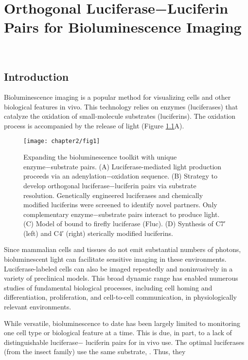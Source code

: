 \chapter{Orthogonal Luciferase−Luciferin Pairs for Bioluminescence Imaging}

\



\section{Introduction}
Bioluminescence imaging is a popular method for visualizing
cells and other biological features in vivo.\cite{RN26} This technology
relies on enzymes (luciferases) that catalyze the oxidation of
small-molecule substrates (luciferins). The oxidation process is
accompanied by the release of light (Figure \ref{fig:overview}A).
\begin{figure}[htbp]
\texttt{[image: chapter2/fig1]}
\centering
\caption[Expanding the bioluminescence toolkit with unique
enzyme−substrate pairs]{Expanding the bioluminescence toolkit with unique
enzyme−substrate pairs. (A) Luciferase-mediated light production
proceeds via an adenylation−oxidation sequence. (B) Strategy to
develop orthogonal luciferase−luciferin pairs via substrate resolution.
Genetically engineered luciferases and chemically modified luciferins
were screened to identify novel partners. Only complementary
enzyme−substrate pairs interact to produce light. (C) Model of \dluciferin{}
bound to firefly luciferase (Fluc). (D) Synthesis of C7′ (left)
and C4′ (right) sterically modified luciferins.}
  \label{fig:overview}
\end{figure}
Since
mammalian cells and tissues do not emit substantial numbers
of photons, bioluminescent light can facilitate sensitive imaging
in these environments.\cite{Prescher:2010dv} Luciferase-labeled cells can also be
imaged repeatedly and noninvasively in a variety of preclinical
models. This broad dynamic range has enabled numerous
studies of fundamental biological processes, including cell
homing and differentiation, proliferation, and cell-to-cell
communication, in physiologically relevant environments.\cite{Badr:2011if}
\par
While versatile, bioluminescence to date has been largely
limited to monitoring one cell type or biological feature at a
time. This is due, in part, to a lack of distinguishable luciferase−
luciferin pairs for in vivo use. The optimal luciferases (from the
insect family) use the same substrate, \dluciferin{}.\cite{RN26,RN101} Thus, they
